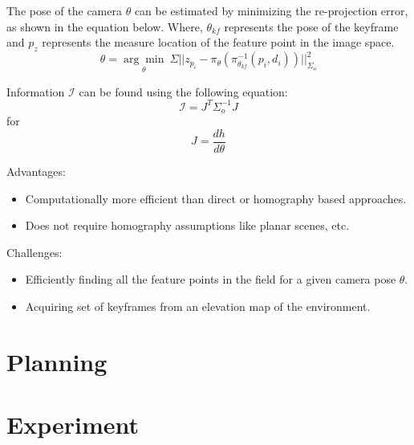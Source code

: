 \documentclass[conference]{IEEEtran}
\begin{document}
The pose of the camera $\theta$ can be estimated by minimizing the re-projection error, as shown in the equation below. Where, $\theta_{kf}$ represents the pose of the keyframe and $p_z$ represents the measure location of the feature point in the image space.
\begin{equation}
     \theta = \underset{\theta}{\arg\min}~\Sigma ||z_{p_i} - \pi_\theta(\pi^{-1}_{\theta_{kf}}(p_i,d_i))||^2_{\Sigma_o}
\end{equation}

Information $\mathcal{I}$ can be found using the following equation:
\begin{equation}
     \mathcal{I} = J^{T}\Sigma^{-1}_{o}J
\end{equation}
for
\begin{equation}
     J = \frac{dh}{d\theta}
\end{equation}

Advantages:
\begin{itemize}
    \item Computationally more efficient than direct or homography based approaches.
    \item Does not require homography assumptions like planar scenes, etc.
\end{itemize}

Challenges:
\begin{itemize}
    \item Efficiently finding all the feature points in the field for a given camera pose $\theta$.
    \item Acquiring set of keyframes from an elevation map of the environment.
\end{itemize}

\section{Planning}\label{sec:planning}



\section{Experiment}\label{sec:experiment}
\end{document}
